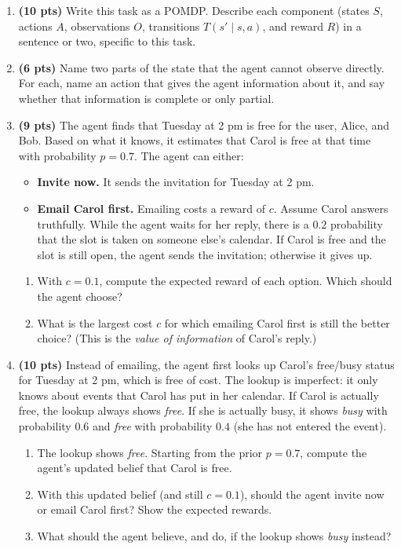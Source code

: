 \documentclass[11pt]{article}
\begin{document}
\begin{enumerate}[label=(\alph*)]

  \item \textbf{(10 pts)} Write this task as a POMDP. Describe each component (states $S$, actions $A$,
  observations $O$, transitions $T(s' \mid s, a)$, and reward $R$) in a sentence or two, specific to this task.

  \item \textbf{(6 pts)} Name two parts of the state that the agent cannot observe directly. For each, name an
  action that gives the agent information about it, and say whether that information is complete or only partial.

  \item \textbf{(9 pts)} The agent finds that Tuesday at 2 pm is free for the user, Alice, and Bob. Based on what it
  knows, it estimates that Carol is free at that time with probability $p = 0.7$. The agent can either:
  \begin{itemize}
    \item \textbf{Invite now.} It sends the invitation for Tuesday at 2 pm.
    \item \textbf{Email Carol first.} Emailing costs a reward of $c$. Assume Carol answers truthfully. While the
    agent waits for her reply, there is a $0.2$ probability that the slot is taken on someone else's calendar. If
    Carol is free and the slot is still open, the agent sends the invitation; otherwise it gives up.
  \end{itemize}
  \begin{enumerate}[label=(\roman*)]
    \item With $c = 0.1$, compute the expected reward of each option. Which should the agent choose?
    \item What is the largest cost $c$ for which emailing Carol first is still the better choice? (This is the
    \emph{value of information} of Carol's reply.)
  \end{enumerate}

  \item \textbf{(10 pts)} Instead of emailing, the agent first looks up Carol's free/busy status for Tuesday at
  2 pm, which is free of cost. The lookup is imperfect: it only knows about events that Carol has put in her
  calendar. If Carol is actually free, the lookup always shows \emph{free}. If she is actually busy, it shows
  \emph{busy} with probability $0.6$ and \emph{free} with probability $0.4$ (she has not entered the event).
  \begin{enumerate}[label=(\roman*)]
    \item The lookup shows \emph{free}. Starting from the prior $p = 0.7$, compute the agent's updated belief that
    Carol is free.
    \item With this updated belief (and still $c = 0.1$), should the agent invite now or email Carol first? Show the
    expected rewards.
    \item What should the agent believe, and do, if the lookup shows \emph{busy} instead?
  \end{enumerate}

\end{enumerate}
\end{document}
